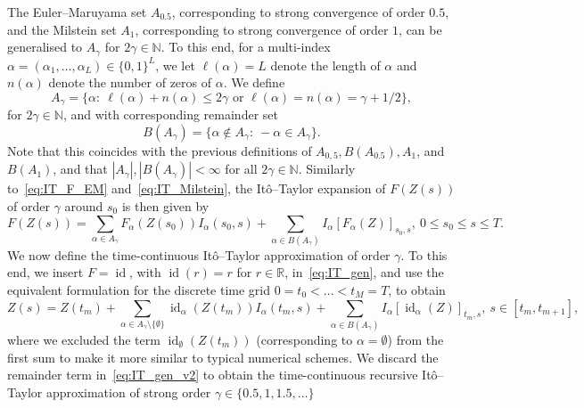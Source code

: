 \documentclass[11pt]{amsart}
\newcommand{\id}{\operatorname{id}}
\begin{document}
{The Euler--Maruyama set $A_{0.5}$, corresponding to strong convergence of order $0.5$, and the Milstein set $A_{1}$, corresponding to strong convergence of order $1$, can be generalised to $A_{\gamma}$ for $2 \gamma \in \mathbb{N}$. To this end, for a multi-index $\alpha = (\alpha_{1},\ldots,\alpha_{L}) \in \{0,1 \}^{L}$, we let $\ell(\alpha) = L$ denote the length of $\alpha$ and $n(\alpha)$ denote the number of zeros of $\alpha$. We define
\begin{equation}\label{eq:def_Agamma}
A_{\gamma} = \{ \alpha:\ \ell(\alpha) + n(\alpha) \leq 2 \gamma \text{ or } \ell(\alpha) = n(\alpha) = \gamma + 1/2 \},
\end{equation}
for $2 \gamma \in \mathbb{N}$, and with corresponding remainder set
\begin{equation*}
B(A_{\gamma}) = \{ \alpha \not\in A_{\gamma}:\ -\alpha \in A_{\gamma} \}.
\end{equation*}
Note that this coincides with the previous definitions of $A_{0,5}, B(A_{0.5}), A_{1}$, and $B(A_{1})$, and that $|A_{\gamma}|, |B(A_{\gamma})| < \infty$ for all $2 \gamma \in \mathbb{N}$. Similarly to~\eqref{eq:IT_F_EM} and~\eqref{eq:IT_Milstein}, the Itô--Taylor expansion of $F(Z(s))$ of order $\gamma$ around $s_{0}$ is then given by
\begin{equation}\label{eq:IT_gen}
F(Z(s)) = \sum_{\alpha \in A_{\gamma}} F_{\alpha}(Z(s_{0})) I_{\alpha}(s_{0},s) + \sum_{\alpha \in B(A_{\gamma})} I_{\alpha}[F_{\alpha}(Z)]_{s_{0},s},\ 0 \leq s_{0} \leq s \leq T.
\end{equation}
We now define the time-continuous Itô--Taylor approximation of order $\gamma$. To this end, we insert $F = \id$, with $\id(r) = r$ for $r \in \mathbb{R}$, in~\eqref{eq:IT_gen}, and use the equivalent formulation for the discrete time grid $0=t_{0} < \ldots < t_{M} = T$, to obtain
\begin{equation}\label{eq:IT_gen_v2}
Z(s) = Z(t_{m}) + \sum_{\alpha \in A_{\gamma} \setminus \{  \emptyset \}} \id_{\alpha}(Z(t_{m})) I_{\alpha}(t_{m},s) + \sum_{\alpha \in B(A_{\gamma})} I_{\alpha}[\id_{\alpha}(Z)]_{t_{m},s},\ s \in [t_{m},t_{m+1}],
\end{equation}
where we excluded the term $\id_{\emptyset}(Z(t_{m}))$ (corresponding to $\alpha = \emptyset$) from the first sum to make it more similar to typical numerical schemes. We discard the remainder term in~\eqref{eq:IT_gen_v2} to obtain the time-continuous recursive Itô--Taylor approximation of strong order $\gamma \in \{0.5,1,1.5,\ldots \}$
\begin{equation}\label{eq:IT_approx}

\end{equation}}
\end{document}
